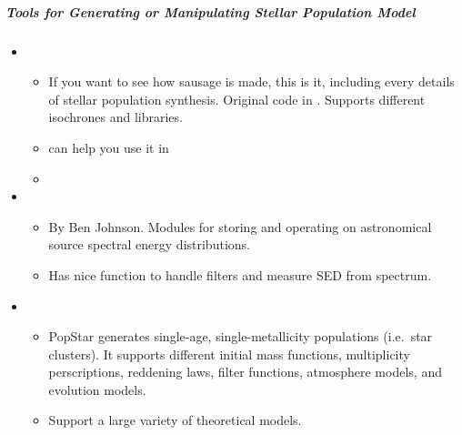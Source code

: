 \documentclass[letterpaper,10pt,english]{sphinxmanual}
\begin{document}
\subparagraph{Tools for Generating or Manipulating Stellar Population Model}
\label{\detokenize{resource/astro/topics/stellar_and_spops:tools-for-generating-or-manipulating-stellar-population-model}}\begin{itemize}
\item {} 
\begin{itemize}
\item {} 
If you want to see how sausage is made, this is it, including
every details of stellar population synthesis. Original code in
. Supports different isochrones and libraries.

\item {} 
 can help you
use it in 

\item {} 

\end{itemize}

\item {} 
\begin{itemize}
\item {} 
By Ben Johnson. Modules for storing and operating on astronomical
source spectral energy distributions.

\item {} 
Has nice function to handle filters and measure SED from spectrum.

\end{itemize}

\item {} 
\begin{itemize}
\item {} 
PopStar generates single-age, single-metallicity populations
(i.e. star clusters). It supports different initial mass
functions, multiplicity perscriptions, reddening laws, filter
functions, atmosphere models, and evolution models.

\item {} 
Support a large variety of theoretical models.

\end{itemize}

\end{itemize}
\end{document}
